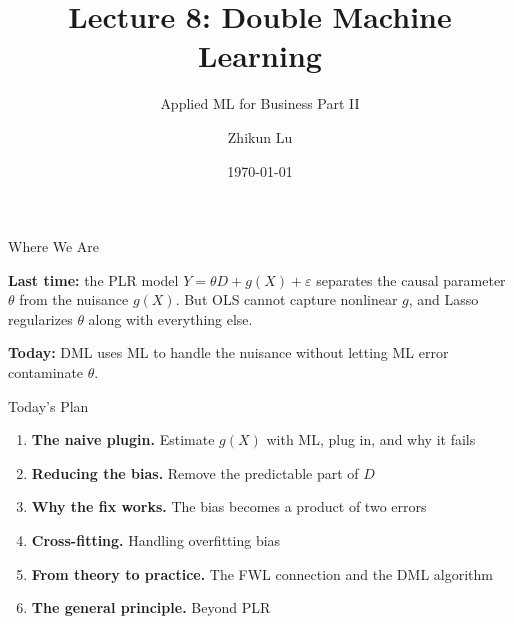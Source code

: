 \documentclass[aspectratio=169, 11pt, handout]{beamer}
\title[Lecture 8]{Lecture 8: Double Machine Learning}
\subtitle{Applied ML for Business Part II}
\author{Zhikun Lu}
\date{\today}
\begin{document}
\begin{frame}
\titlepage
\end{frame}

\begin{frame}{Where We Are}

\begin{center}
\end{center}

\bigskip

\textbf{Last time:} the PLR model $Y = \theta D + g(X) + \varepsilon$ separates the causal parameter $\theta$ from the nuisance $g(X)$. But OLS cannot capture nonlinear $g$, and Lasso regularizes $\theta$ along with everything else.

\bigskip

\textbf{Today:} DML uses ML to handle the nuisance without letting ML error contaminate $\hat{\theta}$.

\end{frame}

\begin{frame}{Today's Plan}

\begin{enumerate}
    \item \textbf{The naive plugin.} Estimate $g(X)$ with ML, plug in, and why it fails
    \item \textbf{Reducing the bias.} Remove the predictable part of $D$
    \item \textbf{Why the fix works.} The bias becomes a product of two errors
    \item \textbf{Cross-fitting.} Handling overfitting bias
    \item \textbf{From theory to practice.} The FWL connection and the DML algorithm
    \item \textbf{The general principle.} Beyond PLR
\end{enumerate}

\end{frame}
\end{document}
